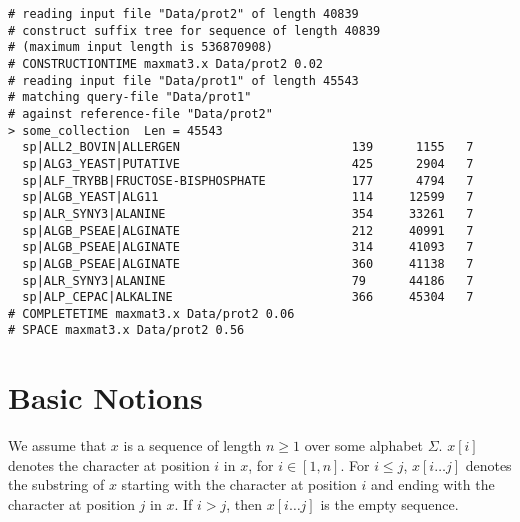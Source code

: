 \documentclass[12pt]{article}
\newcommand{\Subs}[3]{#1[#2\ldots#3]}
\begin{document}
\begin{small}
\begin{verbatim}
# reading input file "Data/prot2" of length 40839
# construct suffix tree for sequence of length 40839
# (maximum input length is 536870908)
# CONSTRUCTIONTIME maxmat3.x Data/prot2 0.02
# reading input file "Data/prot1" of length 45543
# matching query-file "Data/prot1"
# against reference-file "Data/prot2"
> some_collection  Len = 45543
  sp|ALL2_BOVIN|ALLERGEN                        139      1155   7
  sp|ALG3_YEAST|PUTATIVE                        425      2904   7
  sp|ALF_TRYBB|FRUCTOSE-BISPHOSPHATE            177      4794   7
  sp|ALGB_YEAST|ALG11                           114     12599   7
  sp|ALR_SYNY3|ALANINE                          354     33261   7
  sp|ALGB_PSEAE|ALGINATE                        212     40991   7
  sp|ALGB_PSEAE|ALGINATE                        314     41093   7
  sp|ALGB_PSEAE|ALGINATE                        360     41138   7
  sp|ALR_SYNY3|ALANINE                          79      44186   7
  sp|ALP_CEPAC|ALKALINE                         366     45304   7
# COMPLETETIME maxmat3.x Data/prot2 0.06
# SPACE maxmat3.x Data/prot2 0.56
\end{verbatim}
\end{small}

\section{Basic Notions}\label{SecBasicNotions}
We assume that \(x\) is a sequence of length \(n\geq 1\) over some 
alphabet \(\Sigma\).
$x[i]$ denotes the character at position $i$ in $x$,
for $i\in[1,n]$. For $i\leq j$, $\Subs{x}{i}{j}$ denotes the 
substring of $x$ starting with the character at position $i$
and ending with the character at position $j$ in \(x\). If \(i>j\), then 
\(\Subs{x}{i}{j}\) is the empty sequence.
\end{document}
